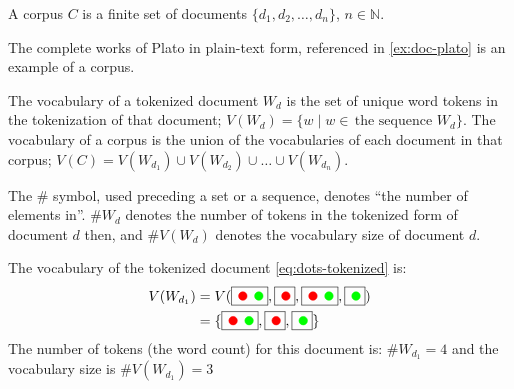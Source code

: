 \begin{definition}[Corpus]
  A corpus $C$ is a finite set of documents $\{d_1, d_2,\dots,d_n\}$, $n\in\mathbb{N}$.
\end{definition}

\begin{example}\label{ex:corp-plato}
  The complete works of Plato in plain-text form, referenced in \autoref{ex:doc-plato} is an example of a corpus.
\end{example}

\begin{definition}[Vocabulary]
  The vocabulary of a tokenized document $W_d$ is the set of unique word tokens in the tokenization of that document; $V(W_d)=\{w\mid w\in\, \text{the sequence $W_d$}\}$. The vocabulary of a corpus is the union of the vocabularies of each document in that corpus; $V(C)=V(W_{d_1})\cup V(W_{d_2})\cup \dots\cup V(W_{d_n})$.
\end{definition}

\begin{definition}[$\#$ Operator]
  The $\#$ symbol, used preceding a set or a sequence, denotes ``the number of elements in''. $\#W_d$ denotes the number of tokens in the tokenized form of document $d$ then, and $\#V(W_d)$ denotes the vocabulary size of document $d$.
\end{definition}

\begin{example}
  The vocabulary of the tokenized document \eqref{eq:dots-tokenized} is:
  \begin{align*}
    V(W_{d_1})&=V(\fbox{\mycirc[red] \mycirc[green]}, \fbox{\mycirc[red]}, \fbox{\mycirc[red] \mycirc[green]}, \fbox{\mycirc[green]})\\
              &=\{\fbox{\mycirc[red] \mycirc[green]}, \fbox{\mycirc[red]}, \fbox{\mycirc[green]}\}
  \end{align*}
  The number of tokens (the word count) for this document is: $\#W_{d_1}=4$ and the vocabulary size is $\#V(W_{d_1})=3$
\end{example}

